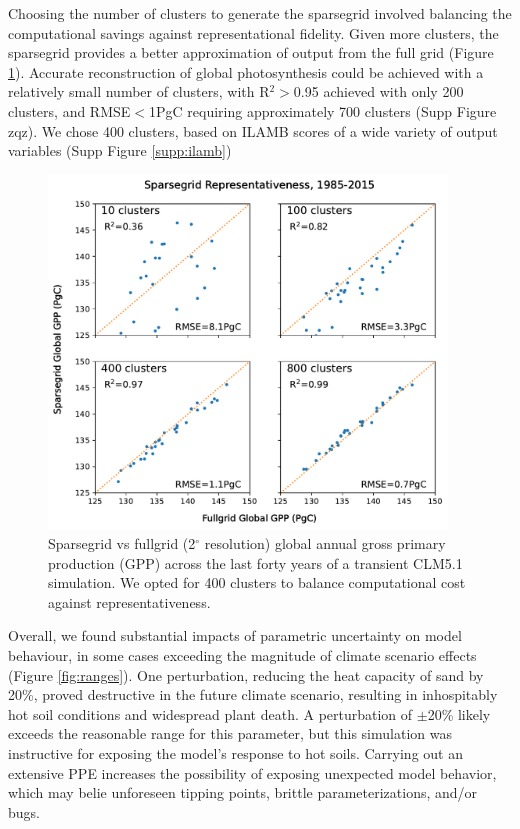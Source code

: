 \documentclass[draft]{agujournal2019}
\begin{document}
Choosing the number of clusters to generate the sparsegrid involved balancing the computational savings against representational fidelity. Given more clusters, the sparsegrid provides a better approximation of output from the full grid (Figure \ref{fig:sg}). Accurate reconstruction of global photosynthesis could be achieved with a relatively small number of clusters, with R$^2>$0.95 achieved with only 200 clusters, and RMSE$<$1PgC requiring approximately 700 clusters (Supp Figure zqz). We chose 400 clusters, based on ILAMB scores of a wide variety of output variables (Supp Figure \ref{supp:ilamb})
\begin{figure}[h]
\centering
\includegraphics[width=25pc]{../figs/sparsegrid_gpp.pdf}
\caption{Sparsegrid vs fullgrid (2$^{\circ}$ resolution) global annual gross primary production (GPP) across the last forty years of a transient CLM5.1 simulation. We opted for 400 clusters to balance computational cost against representativeness.}
\label{fig:sg}
\end{figure}

Overall, we found substantial impacts of parametric uncertainty on model behaviour, in some cases exceeding the magnitude of climate scenario effects (Figure \ref{fig:ranges}). One perturbation, reducing the heat capacity of sand by 20\%, proved destructive in the future climate scenario, resulting in inhospitably hot soil conditions and widespread plant death. A perturbation of $\pm$20\% likely exceeds the reasonable range for this parameter, but this simulation was instructive for exposing the model's response to hot soils. Carrying out an extensive PPE increases the possibility of exposing unexpected model behavior, which may belie unforeseen tipping points, brittle parameterizations,  and/or bugs.
\end{document}
